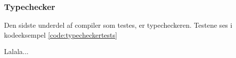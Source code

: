 \subsubsection{Typechecker}
Den sidste underdel af compiler som testes, er typecheckeren. Testene ses i kodeeksempel \ref{code:typecheckertests}


\noindent Lalala...